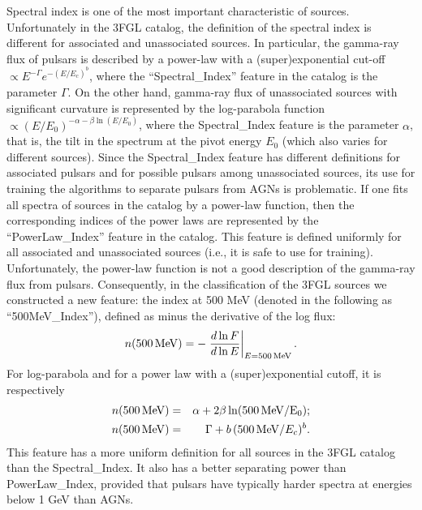 \documentclass[referee]{aa} %
\newcommand{\bea}{\begin{eqnarray}}
\newcommand{\eea}{\end{eqnarray}}
\newcommand{\lb}{\label}
\newcommand{\al}{\alpha}
\newcommand{\bt}{\beta}
\begin{document}
Spectral index is one of the most important characteristic of sources. 
Unfortunately in the 3FGL catalog, the definition of the spectral index is different for associated and unassociated sources.
In particular, the gamma-ray flux of pulsars is described by a power-law with a (super)exponential cut-off $\propto E^{-\Gamma} e^{-(E / E_c)^b}$, where the ``Spectral\_Index'' feature in the catalog is the parameter $\Gamma$.
On the other hand, gamma-ray flux of unassociated sources with significant curvature is represented by the log-parabola function $\propto (E/E_0)^{-\al - \bt \ln (E/E_0)}$,
where the Spectral\_Index 
feature is the parameter $\al$, that is, the tilt in the spectrum at the pivot energy $E_0$ (which also varies for different sources).
Since the Spectral\_Index feature has different definitions for associated pulsars and for possible pulsars among unassociated sources,
its use for training the algorithms to separate pulsars from AGNs is problematic.
If one fits all spectra of sources in the catalog by a power-law function, then the corresponding indices of the power laws are represented by the
``PowerLaw\_Index'' feature in the catalog.
This feature is defined uniformly for all associated and unassociated sources (i.e., it is safe to use for training).
Unfortunately, the power-law function is not a good description of the gamma-ray flux from pulsars.
Consequently, in the classification of the 3FGL sources we constructed a new feature: the index at 500 MeV (denoted in the following as ``500MeV\_Index''), defined as minus the derivative of the log flux:
\bea
\lb{eq:n500_def}
n({\rm 500\,MeV}) = - \left. \frac{d \ln F}{d \ln E} \right|_{E = \rm 500\,MeV}
.\eea
For log-parabola and for a power law with a (super)exponential cutoff, it is respectively
\bea
n(\rm 500\,MeV) &=& \al + 2 \bt \ln(\rm 500\,MeV / E_0);    \\
n({\rm 500\,MeV}) &=& \Gamma + b\,({\rm 500\,MeV} / E_c)^b
.\eea
This feature has a more uniform definition for all sources in the 3FGL catalog than the Spectral\_Index. It also has a better separating power 
than PowerLaw\_Index, provided that pulsars have typically harder spectra at energies below 1 GeV than AGNs.
\end{document}
